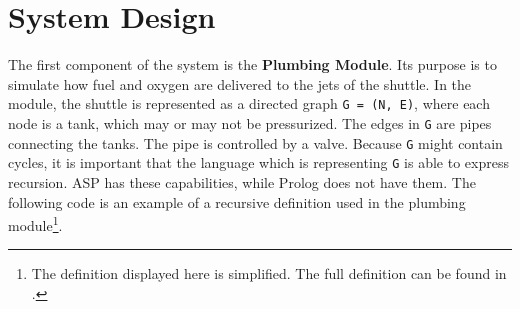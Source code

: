 \documentclass[runningheads]{llncs}
\newcommand{\authorquote}{Nogueira \etal}
\begin{document}
\begin{comment}
\begin{itemize}
    \item medium sized knowledge-intensive system for computing answer sets 
    \item System can do (1) check if a sequence of actions sattisifies a goal (2) give me a list of max k instructions to reach a goal.
    \item Build medium-sized logical program for Retraction Control System (RCS)
    \item To execute a maneuver, you have to find a plan, even if there is malfunction. A system should find an alternative sequence of instructions, if the one that you wanted to do is not possible, because of malfunctions.
    \item system is consists of four different modules: plumbing module, valve control module and planning module. 
    \item VCM can be separated into multiple parts: Basic and extended. 
    \item This article will give a brief overview of the different components and highlight the importance of ASP as their implementation language. 
\end{itemize}
\end{comment}




\section{System Design} \label{sec:system_design}


The first component of the system is the \textbf{Plumbing Module}. Its purpose is to simulate how fuel and oxygen are delivered to the jets of the shuttle. In the module, the shuttle is represented as a directed graph \verb|G = (N, E)|, where each node is a tank, which may or may not be pressurized. The edges in \verb|G| are pipes connecting the tanks. The pipe is controlled by a valve. Because \verb|G| might contain cycles, it is important that the language which is representing \verb|G| is able to express recursion. ASP has these capabilities, while Prolog does not have them. The following code is an example of a recursive definition used in the plumbing module\footnote{The definition displayed here is simplified. The full definition can be found in \cite{nogueira2001prolog}.}. 
\end{document}
